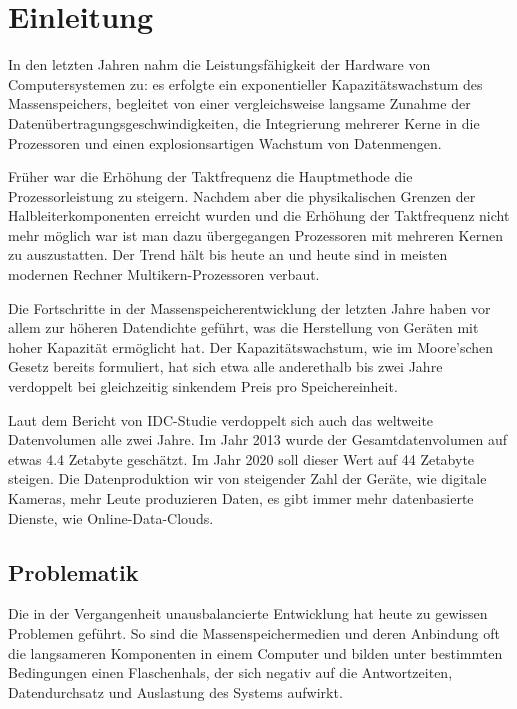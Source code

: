 
\section{Einleitung}
In den letzten Jahren nahm die Leistungsfähigkeit der Hardware von Computersystemen zu: es erfolgte ein exponentieller Kapazitätswachstum des Massenspeichers, begleitet von einer vergleichsweise langsame Zunahme der Datenübertragungsgeschwindigkeiten, die Integrierung mehrerer Kerne in die Prozessoren und einen explosionsartigen Wachstum von Datenmengen.

Früher war die Erhöhung der Taktfrequenz die Hauptmethode die Prozessorleistung zu steigern. Nachdem aber die physikalischen Grenzen der Halbleiterkomponenten erreicht wurden und die Erhöhung der Taktfrequenz nicht mehr möglich war ist man dazu übergegangen Prozessoren mit mehreren Kernen zu auszustatten. Der Trend hält bis heute an und heute sind in meisten modernen Rechner Multikern-Prozessoren verbaut.

Die Fortschritte in der Massenspeicherentwicklung der letzten Jahre haben vor allem zur höheren Datendichte geführt, was die Herstellung von Geräten mit hoher Kapazität ermöglicht hat. Der Kapazitätswachstum, wie im Moore'schen Gesetz bereits formuliert, hat sich etwa alle anderethalb bis zwei Jahre verdoppelt bei gleichzeitig sinkendem Preis pro Speichereinheit.

Laut dem Bericht von IDC-Studie \cite{idc} verdoppelt sich auch das weltweite Datenvolumen alle zwei Jahre. Im Jahr 2013 wurde der Gesamtdatenvolumen auf etwas 4.4 Zetabyte geschätzt. Im Jahr 2020 soll dieser Wert auf 44 Zetabyte steigen. Die Datenproduktion wir von steigender Zahl der Geräte, wie digitale Kameras, mehr Leute produzieren Daten, es gibt immer mehr datenbasierte Dienste, wie Online-Data-Clouds.



\subsection{Problematik}
Die in der Vergangenheit unausbalancierte Entwicklung hat heute zu gewissen Problemen geführt.
So sind die Massenspeichermedien und deren Anbindung oft die langsameren Komponenten in einem Computer und bilden unter bestimmten Bedingungen einen Flaschenhals, der sich negativ auf die Antwortzeiten, Datendurchsatz und Auslastung des Systems aufwirkt. 

